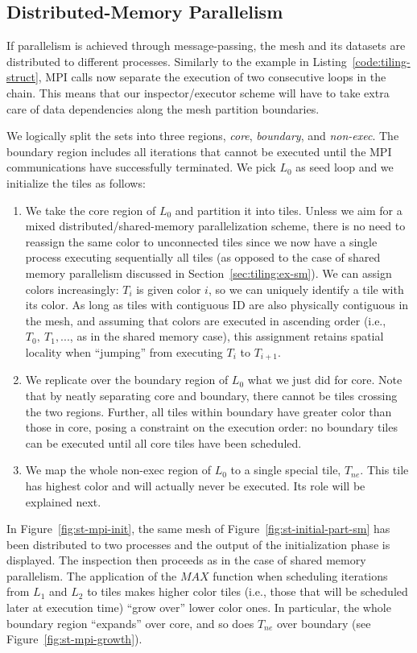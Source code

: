 \subsection{Distributed-Memory Parallelism}
\label{sec:tiling:ex-dist}
If parallelism is achieved through message-passing, the mesh and its datasets are distributed to different processes. Similarly to the example in Listing~\ref{code:tiling-struct}, MPI calls now separate the execution of two consecutive loops in the chain. This means that our inspector/executor scheme will have to take extra care of data dependencies along the mesh partition boundaries.

We logically split the sets into three regions, \textit{core}, \textit{boundary}, and \textit{non-exec}. The boundary region includes all iterations that cannot be executed until the MPI communications have successfully terminated. We pick $L_0$ as seed loop and we initialize the tiles as follows:
\begin{enumerate}
\item We take the core region of $L_0$ and partition it into tiles. Unless we aim for a mixed distributed/shared-memory parallelization scheme, there is no need to reassign the same color to unconnected tiles since we now have a single process executing sequentially all tiles (as opposed to the case of shared memory parallelism discussed in Section~\ref{sec:tiling:ex-sm}). We can assign colors increasingly: $T_i$ is given color $i$, so we can uniquely identify a tile with its color. As long as tiles with contiguous ID are also physically contiguous in the mesh, and assuming that colors are executed in ascending order (i.e., $T_0,\ T_1, ...$, as in the shared memory case), this assignment retains spatial locality when ``jumping'' from executing $T_i$ to $T_{i+1}$.
\item We replicate over the boundary region of $L_0$ what we just did for core. Note that by neatly separating core and boundary, there cannot be tiles crossing the two regions. Further, all tiles within boundary have greater color than those in core, posing a constraint on the execution order: no boundary tiles can be executed until all core tiles have been scheduled.
\item We map the whole non-exec region of $L_0$ to a single special tile, $T_{ne}$. This tile has highest color and will actually never be executed. Its role will be explained next.
\end{enumerate}

In Figure~\ref{fig:st-mpi-init}, the same mesh of Figure~\ref{fig:st-initial-part-sm} has been distributed to two processes and the output of the initialization phase is displayed. The inspection then proceeds as in the case of shared memory parallelism. The application of the $MAX$ function when scheduling iterations from $L_1$ and $L_2$ to tiles makes higher color tiles (i.e., those that will be scheduled later at execution time) ``grow over'' lower color ones. In particular, the whole boundary region ``expands'' over core, and so does $T_{ne}$ over boundary (see Figure~\ref{fig:st-mpi-growth}). 

